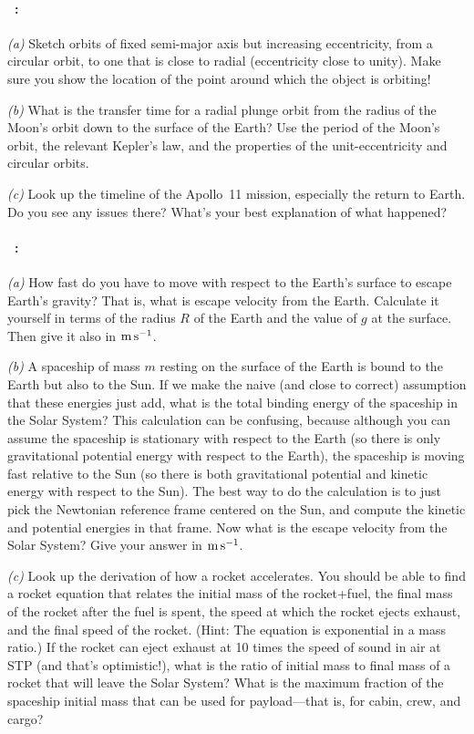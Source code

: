 \documentclass[12pt]{article}
\begin{document}
\paragraph{\problemname~\theproblem:}%
\textsl{(a)}
Sketch orbits of fixed semi-major axis but increasing
eccentricity, from a circular orbit, to one that is close to radial
(eccentricity close to unity). Make sure you show the location of
the point around which the object is orbiting!

\textsl{(b)}
What is the transfer time for a radial plunge orbit
from the radius of the Moon's orbit down to the surface of the Earth?
Use the period of the Moon's orbit, the relevant  Kepler's law, and
the properties of the unit-eccentricity and circular orbits.

\textsl{(c)}
Look up the timeline of the Apollo~11 mission, especially
the return to Earth.  Do you see any issues there? What's your best
explanation of what happened?

\paragraph{\problemname~\theproblem:}%
\textsl{(a)}
How fast do you have to move with respect to the Earth's surface to
escape Earth's gravity? That is, what is escape velocity from the Earth.
Calculate it yourself in terms of the radius $R$ of the Earth and the
value of $g$ at the surface. Then give it also in $\mathrm{m}\,\mathrm{s}^{-1}$.

\textsl{(b)} A spaceship of mass $m$ resting on the surface of the
Earth is bound to the Earth but also to the Sun. If we make
the naive (and close to correct) assumption that these energies just
add, what is the total binding energy of the spaceship in the Solar
System? This calculation can be confusing, because although you can assume
the spaceship is stationary with respect to the Earth (so there is
only gravitational potential energy with respect to the Earth), the
spaceship is moving fast relative to the Sun (so there is both
gravitational potential and kinetic energy with respect to the
Sun). The best way to do the calculation is to just pick the Newtonian reference
frame centered on the Sun, and compute the kinetic and potential
energies in that frame. Now what is the escape velocity from the Solar
System? Give your answer in $\mathrm{m}\,\mathrm{s}^{-1}$.

\textsl{(c)} Look up the derivation of how a rocket accelerates. You
should be able to find a rocket equation that relates the initial mass
of the rocket+fuel, the final mass of the rocket after the fuel is
spent, the speed at which the rocket ejects exhaust, and the final
speed of the rocket. (Hint: The equation is exponential in a mass
ratio.) If the rocket can eject exhaust at 10 times the speed of sound
in air at STP (and that's optimistic!), what is the ratio of initial
mass to final mass of a rocket that will leave the Solar System? What
is the maximum fraction of the spaceship initial mass that can be used
for payload---that is, for cabin, crew, and cargo?
\end{document}
